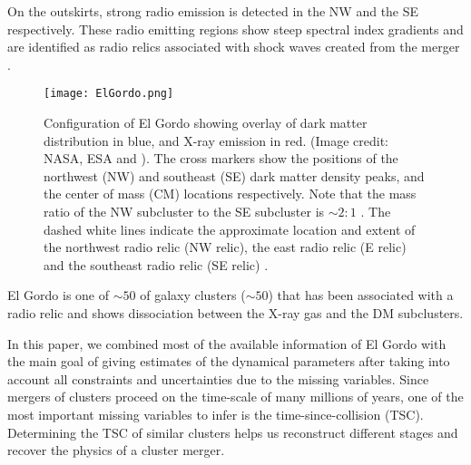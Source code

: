 On the outskirts, strong radio emission is detected in
the NW and the SE respectively. These radio emitting regions show steep spectral
index gradients and are identified as radio relics associated with shock waves
created from the merger \citep{L13}. 
\begin{figure}
	\texttt{[image: ElGordo.png]}
	\caption{Configuration of El Gordo showing overlay of dark
		matter distribution in blue, and X-ray emission in red. 
		(Image credit: NASA, ESA and \citealt{Jee13}). 
		The cross markers show the positions of the northwest (NW) and
		southeast (SE) dark matter density peaks, and the center of mass (CM)
		locations respectively. Note that the mass ratio of the NW subcluster
		to the SE subcluster is $\sim 2:1$ \citep{Jee13}. 
		The dashed white lines indicate the approximate location and extent of the northwest radio relic (NW relic), the east radio relic (E relic) and the
		southeast radio relic (SE relic) \citep{L13}.
		\label{fig:config}}
\end{figure}
El Gordo is one of $\sim 50$ of galaxy clusters ($\sim50$) that has
been associated with a radio relic and shows dissociation between the X-ray
gas and the DM subclusters. \par 
In this paper, we combined most of the available information of El Gordo
with the main goal of giving estimates of
the dynamical parameters after taking into account all
constraints and uncertainties due to the missing variables.
Since mergers of clusters proceed on the time-scale of many millions of
years, one of the most important missing variables to infer is the
time-since-collision (TSC).
Determining the TSC of similar clusters helps
us reconstruct different stages and recover the physics of a cluster merger.

